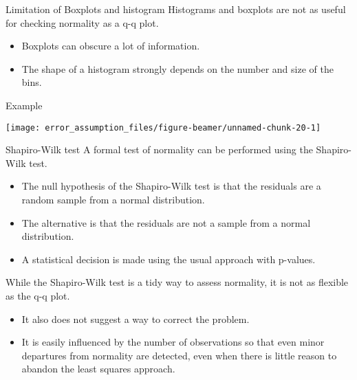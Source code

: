 \begin{frame}{Limitation of Boxplots and histogram}
\protect\hypertarget{limitation-of-boxplots-and-histogram}{}
Histograms and boxplots are not as useful for checking normality as a
q-q plot.

\begin{itemize}
\tightlist
\item
  Boxplots can obscure a lot of information.
\item
  The shape of a histogram strongly depends on the number and size of
  the bins.
\end{itemize}
\end{frame}

\begin{frame}{Example}
\protect\hypertarget{example}{}
\begin{center}\texttt{[image: error\_assumption\_files/figure-beamer/unnamed-chunk-20-1]} \end{center}
\end{frame}

\begin{frame}{Shapiro-Wilk test}
\protect\hypertarget{shapiro-wilk-test}{}
A formal test of normality can be performed using the Shapiro-Wilk test.

\begin{itemize}
\tightlist
\item
  The null hypothesis of the Shapiro-Wilk test is that the residuals are
  a random sample from a normal distribution.\\
\item
  The alternative is that the residuals are not a sample from a normal
  distribution.
\item
  A statistical decision is made using the usual approach with p-values.
\end{itemize}

While the Shapiro-Wilk test is a tidy way to assess normality, it is not
as flexible as the q-q plot.

\begin{itemize}
\tightlist
\item
  It also does not suggest a way to correct the problem.
\item
  It is easily influenced by the number of observations so that even
  minor departures from normality are detected, even when there is
  little reason to abandon the least squares approach.
\end{itemize}
\end{frame}

